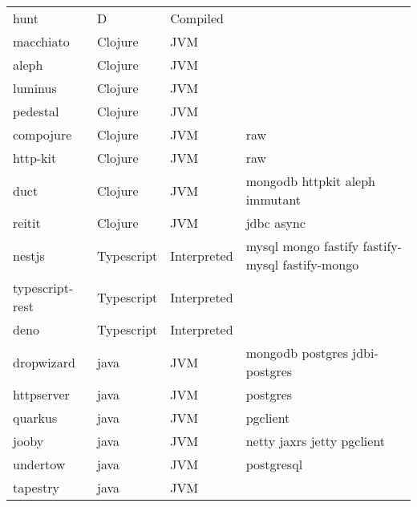 \begin{longtable}{llll}
    hunt             & D           & Compiled    &                                                    \\
    macchiato        & Clojure     & JVM         &                                                    \\
    aleph            & Clojure     & JVM         &                                                    \\
    luminus          & Clojure     & JVM         &                                                    \\
    pedestal         & Clojure     & JVM         &                                                    \\
    compojure        & Clojure     & JVM         & raw                                                \\
    http-kit         & Clojure     & JVM         & raw                                                \\
    duct             & Clojure     & JVM         & mongodb httpkit aleph immutant                     \\
    reitit           & Clojure     & JVM         & jdbc async                                         \\
    nestjs           & Typescript  & Interpreted & mysql mongo fastify fastify-mysql fastify-mongo    \\
    typescript-rest  & Typescript  & Interpreted &                                                    \\
    deno             & Typescript  & Interpreted &                                                    \\
    dropwizard       & java        & JVM         & mongodb postgres jdbi-postgres                     \\
    httpserver       & java        & JVM         & postgres                                           \\
    quarkus          & java        & JVM         & pgclient                                           \\
    jooby            & java        & JVM         & netty jaxrs jetty pgclient                         \\
    undertow         & java        & JVM         & postgresql                                         \\
    tapestry         & java        & JVM         &                                                    \\

\end{longtable}
